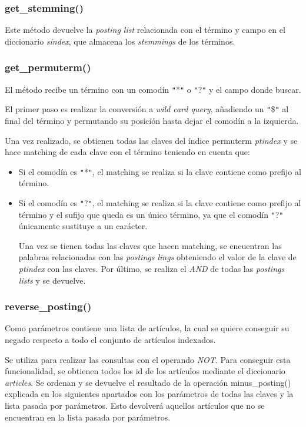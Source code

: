 \documentclass[12pt,a4paper]{article}
\begin{document}
\subsubsection{get\_stemming()}
Este método devuelve la \textit{posting list} relacionada con el término y campo en el diccionario \textit{sindex}, que almacena los \textit{stemmings} de los términos.
\subsubsection{get\_permuterm()}
El método recibe un término con un comodín \texttt{"}*\texttt{"} o \texttt{"}?\texttt{"} y el campo donde buscar.

 El primer paso es realizar la conversión a \textit{wild card query}, añadiendo un \texttt{"}\$\texttt{"} al final del término y permutando su posición hasta dejar el comodín a la izquierda.

 Una vez realizado, se obtienen todas las claves del índice permuterm \textit{ptindex} y se hace matching de cada clave con el término teniendo en cuenta que:
 \begin{itemize}
\item Si el comodín es \texttt{"}*\texttt{"}, el matching se realiza si la clave contiene como prefijo al término.
\item Si el comodín es \texttt{"}?\texttt{"}, el matching se realiza si la clave contiene como prefijo al término y el sufijo que queda es un único término, ya que el comodín \texttt{"}?\texttt{"} únicamente sustituye a un carácter.

Una vez se tienen todas las claves que hacen matching, se encuentran las palabras relacionadas con las \textit{postings lings} obteniendo el valor de la clave de \textit{ptindex} con las claves. Por último, se realiza el \textit{AND} de todas las \textit{postings lists} y se devuelve.
\end{itemize}

\subsubsection{reverse\_posting()}
Como parámetros contiene una lista de artículos, la cual se quiere conseguir su negado respecto a todo el conjunto de artículos indexados.

Se utiliza para realizar las consultas con el operando \textit{NOT}. Para conseguir esta funcionalidad, se obtienen todos los id de los artículos mediante el diccionario \textit{articles}. Se ordenan y se devuelve el resultado de la operación minus\_posting() explicada en los siguientes apartados con los parámetros de todas las claves y la lista pasada por parámetros. Esto devolverá aquellos artículos que no se encuentran en la lista pasada por parámetros.
\end{document}

